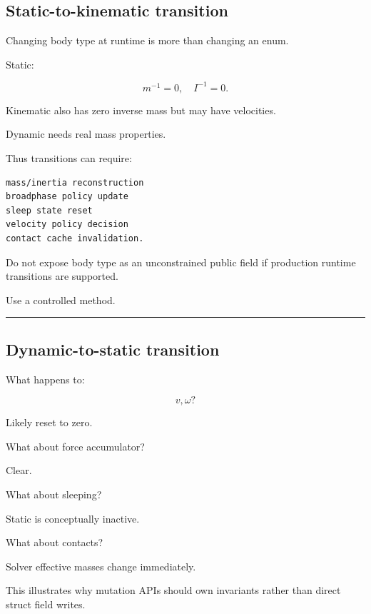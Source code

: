 \subsection{Static-to-kinematic transition}\label{06-engine-ii-ch038-static-to-kinematic-transition}

\hypertarget{06-engine-ii-ch038-static-to-kinematic-transition}{}

Changing body type at runtime is more than changing an enum.

Static:

\[
m^{-1}=0,\quad I^{-1}=0.
\]

Kinematic also has zero inverse mass but may have velocities.

Dynamic needs real mass properties.

Thus transitions can require:

\begin{verbatim}
mass/inertia reconstruction
broadphase policy update
sleep state reset
velocity policy decision
contact cache invalidation.
\end{verbatim}

Do not expose body type as an unconstrained public field if production runtime transitions are supported.

Use a controlled method.

\begin{center}\rule{0.5\linewidth}{0.5pt}\end{center}

\subsection{Dynamic-to-static transition}\label{06-engine-ii-ch038-dynamic-to-static-transition}

\hypertarget{06-engine-ii-ch038-dynamic-to-static-transition}{}

What happens to:

\[
v,\omega?
\]

Likely reset to zero.

What about force accumulator?

Clear.

What about sleeping?

Static is conceptually inactive.

What about contacts?

Solver effective masses change immediately.

This illustrates why mutation APIs should own invariants rather than direct struct field writes.

